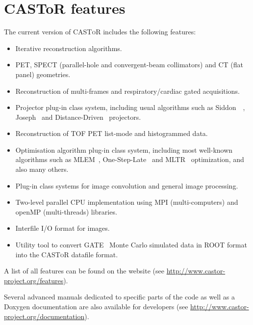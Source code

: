 \documentclass[a4paper, 11pt]{article}
\newcommand{\castor}{\textsc{CASToR}\xspace}
\begin{document}
\section{CASToR features}
\label{s_features}

The current version of \castor includes the following features:

\begin{itemize}
  \item Iterative reconstruction algorithms.
  \item PET, SPECT (parallel-hole and convergent-beam collimators) and CT (flat panel) geometries.
  \item Reconstruction of multi-frames and respiratory/cardiac gated acquisitions.
  \item Projector plug-in class system, including usual algorithms such as Siddon~\cite{Siddon}~\cite{FastSiddon}, Joseph~\cite{Joseph} and Distance-Driven~\cite{DistanceDriven} projectors.
  \item Reconstruction of TOF PET list-mode and histogrammed data.
  \item Optimisation algorithm plug-in class system, including most well-known algorithms such as MLEM~\cite{MLEM}, One-Step-Late~\cite{OSL} and MLTR~\cite{MLTR} optimization, and also many others.
  \item Plug-in class systems for image convolution and general image processing.
  \item Two-level parallel CPU implementation using MPI (multi-computers) and openMP (multi-threads) libraries.
  \item Interfile I/O format for images.
  \item Utility tool to convert GATE~\cite{GATE} Monte Carlo simulated data in ROOT format~\cite{ROOT} into the \castor datafile format.
\end{itemize}

A list of all features can be found on the website (see \url{http://www.castor-project.org/features}).

Several advanced manuals dedicated to specific parts of the code as well as a Doxygen documentation are also available for developers (see \url{http://www.castor-project.org/documentation}).


\newpage
\end{document}
